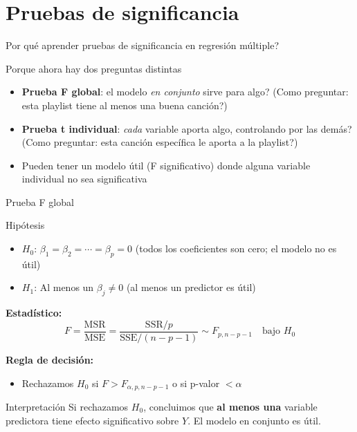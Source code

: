 \documentclass[aspectratio=169, 11pt]{beamer}
\begin{document}
\section{Pruebas de significancia}

\begin{frame}{\textquestiondown{}Por qu\'e aprender pruebas de significancia en regresi\'on m\'ultiple?}
\begin{exampleblock}{Porque ahora hay dos preguntas distintas}
\small
\begin{itemize}\setlength{\itemsep}{2pt}
  \item \textbf{Prueba F global}: \textquestiondown{}el modelo \textit{en conjunto} sirve para algo? (Como preguntar: \textquestiondown{}esta playlist tiene al menos una buena canci\'on?)
  \item \textbf{Prueba t individual}: \textquestiondown{}\textit{cada} variable aporta algo, controlando por las dem\'as? (Como preguntar: \textquestiondown{}esta canci\'on espec\'ifica le aporta a la playlist?)
  \item Pueden tener un modelo \'util (F significativo) donde alguna variable individual no sea significativa
\end{itemize}
\end{exampleblock}
\end{frame}

\begin{frame}{Prueba F global}
\begin{block}{Hipótesis}
\begin{itemize}
  \item $H_0$: $\beta_1 = \beta_2 = \cdots = \beta_p = 0$ (todos los coeficientes son cero; el modelo no es útil)
  \item $H_1$: Al menos un $\beta_j \neq 0$ (al menos un predictor es útil)
\end{itemize}
\end{block}

\vspace{0.2cm}
\textbf{Estadístico:}
\[
F = \frac{\text{MSR}}{\text{MSE}} = \frac{\text{SSR}/p}{\text{SSE}/(n - p - 1)} \sim F_{p, n-p-1} \quad \text{bajo } H_0
\]

\vspace{0.2cm}
\textbf{Regla de decisión:}
\begin{itemize}
  \item Rechazamos $H_0$ si $F > F_{\alpha, p, n-p-1}$ o si p-valor $< \alpha$
\end{itemize}

\vspace{0.2cm}
\begin{exampleblock}{Interpretación}
Si rechazamos $H_0$, concluimos que \textbf{al menos una} variable predictora tiene efecto significativo sobre $Y$. El modelo en conjunto es útil.
\end{exampleblock}
\end{frame}
\end{document}
